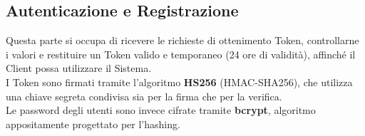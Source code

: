 
\subsection{Autenticazione e Registrazione}

Questa parte si occupa di ricevere le richieste di ottenimento Token, controllarne i valori e restituire un Token valido e temporaneo (24 ore di validità), affinché il Client possa utilizzare il Sistema.\\
I Token sono firmati tramite l'algoritmo \textbf{HS256} (HMAC-SHA256), che utilizza una chiave segreta condivisa sia per la firma che per la verifica.\\
Le password degli utenti sono invece cifrate tramite \textbf{bcrypt}, algoritmo appositamente progettato per l'hashing.




